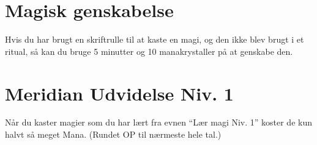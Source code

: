 \section{Magisk genskabelse}
Hvis du har brugt en skriftrulle til at kaste en magi, og den ikke blev brugt i et ritual, så kan du bruge 5 minutter og 10 manakrystaller på at genskabe den. 

\section{Meridian Udvidelse Niv. 1}
Når du kaster magier som du har lært fra evnen “Lær magi Niv. 1” koster de kun halvt så meget Mana. (Rundet OP til nærmeste hele tal.)
